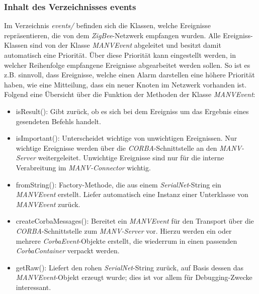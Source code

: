     \subsubsection{Inhalt des Verzeichnisses events}
    
    Im Verzeichnis \emph{events/} befinden sich die Klassen, welche Ereignisse repräsentieren, die von dem 
    \emph{ZigBee}-Netzwerk empfangen wurden. Alle Ereigniss-Klassen sind von der Klasse \emph{MANVEvent} abgeleitet 
    und besitzt damit automatisch eine Priorität. Über diese Priorität kann eingestellt werden, in welcher Reihenfolge 
    empfangene Ereignisse abgearbeitet werden sollen. So ist es z.B. sinnvoll, dass Ereignisse, welche einen Alarm 
    darstellen eine höhere Priorität haben, wie eine Mitteilung, dass ein neuer Knoten im Netzwerk vorhanden ist. 
    Folgend eine Übersicht über die Funktion der Methoden der Klasse \emph{MANVEvent}:

    \begin{itemize}
            \item{isResult():} Gibt zurück, ob es sich bei dem Ereigniss um das Ergebnis eines gesendeten Befehls handelt. 
            \item{isImportant():} Unterscheidet wichtige von unwichtigen Ereignissen. Nur wichtige Ereignisse werden über 
                                  die \emph{CORBA}-Schnittstelle an den \emph{MANV-Server} weitergeleitet. Unwichtige 
                                  Ereignisse sind nur für die interne Verabreitung im \emph{MANV-Connector} wichtig. 
            \item{fromString():}  Factory-Methode, die aus einem \emph{SerialNet}-String ein \emph{MANVEvent} erstellt. 
                                  Liefer automatisch eine Instanz einer Unterklasse von \emph{MANVEvent} zurück.
            \item{createCorbaMessages():} Bereitet ein \emph{MANVEvent} für den Transport über die 
                                          \emph{CORBA}-Schnittstelle zum \emph{MANV-Server} vor. Hierzu werden ein oder 
                                          mehrere \emph{CorbaEvent}-Objekte erstellt, die wiederrum in einen
                                          passenden \emph{CorbaContainer} verpackt werden.
            \item{getRaw():} Liefert den rohen \emph{SerialNet}-String zurück, auf Basis dessen das \emph{MANVEvent}-Objekt 
                             erzeugt wurde; dies ist vor allem für Debugging-Zwecke interessant.
    \end{itemize}

